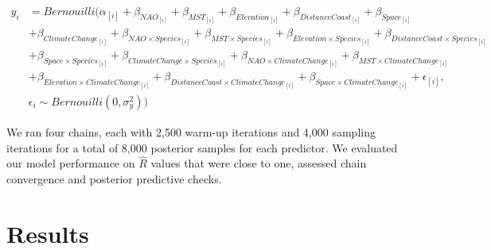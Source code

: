 \documentclass{article}\usepackage[]{graphicx}\usepackage[]{color}
\begin{document}
\begin{align*}
y_i &= Bernouilli(\alpha_{[i]} +  \beta_{NAO_{[i]}} + \beta_{MST_{[i]}} + \beta_{Elevation_{[i]}} + \beta_{DistanceCoast_{[i]}} + \beta_{Space_{[i]}} \\ 
  &+ \beta_{ClimateChange_{[i]}} + \beta_{NAO \times Species_{[i]}} + \beta_{MST \times Species_{[i]}} + \beta_{Elevation \times Species_{[i]}} + \beta_{DistanceCoast \times Species_{[i]}}\\
  &+ \beta_{Space \times Species_{[i]}} + \beta_{ClimateChange \times Species_{[i]}} + \beta_{NAO \times ClimateChange_{[i]}} + \beta_{MST \times ClimateChange_{[i]}}\\
  &+ \beta_{Elevation \times ClimateChange_{[i]}} + \beta_{DistanceCoast \times ClimateChange_{[i]}} + \beta_{Space \times ClimateChange_{[i]}} + \epsilon_{[i]},\nonumber\\
  & \epsilon_i \sim Bernouilli(0,\sigma^2_y))\tag{1}
\end{align*}

We ran four chains, each with 2,500 warm-up iterations and 4,000 sampling iterations for a total of 8,000 posterior samples for each predictor. We evaluated our model performance on $\hat{R}$ values that were close to one, assessed chain convergence and posterior predictive checks.%



\section*{Results}
\end{document}
